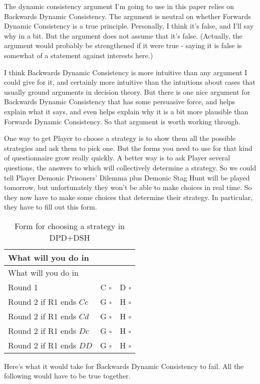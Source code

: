 \documentclass[
  12pt,
]{article}
\begin{document}
The dynamic consistency argument I'm going to use in this paper relies
on Backwards Dynamic Consistency. The argument is neutral on whether
Forwards Dynamic Consistency is a true principle. Personally, I think
it's false, and I'll say why in a bit. But the argument does not assume
that it's false. (Actually, the argument would probably be strengthened
if it were true - saying it is false is somewhat of a statement against
interests here.)

I think Backwards Dynamic Consistency is more intuitive than any
argument I could give for it, and certainly more intuitive than the
intuitions about cases that usually ground arguments in decision theory.
But there is one nice argument for Backwards Dynamic Consistency that
has some persuasive force, and helps explain what it says, and even
helps explain why it is a bit more plausible than Forwards Dynamic
Consistency. So that argument is worth working through.

One way to get Player to choose a strategy is to show them all the
possible strategies and ask them to pick one. But the forms you need to
use for that kind of questionnaire grow really quickly. A better way is
to ask Player several questions, the answers to which will collectively
determine a strategy. So we could tell Player Demonic Prisoners' Dilemma
plus Demonic Stag Hunt will be played tomorrow, but unfortunately they
won't be able to make choices in real time. So they now have to make
some choices that determine their strategy. In particular, they have to
fill out this form.

\begin{longtable}[]{@{}lcc@{}}
\caption{Form for choosing a strategy in DPD+DSH}\tabularnewline
\toprule
What will you do in & & \\
\midrule
\endfirsthead
\toprule
What will you do in & & \\
\midrule
\endhead
Round 1 & C \(\square\) & D \(\square\) \\
Round 2 if R1 ends \(Cc\) & G \(\square\) & H \(\square\) \\
Round 2 if R1 ends \(Cd\) & G \(\square\) & H \(\square\) \\
Round 2 if R1 ends \(Dc\) & G \(\square\) & H \(\square\) \\
Round 2 if R1 ends \(DD\) & G \(\square\) & H \(\square\) \\
\bottomrule
\end{longtable}

Here's what it would take for Backwards Dynamic Consistency to fail. All
the following would have to be true together.
\end{document}
